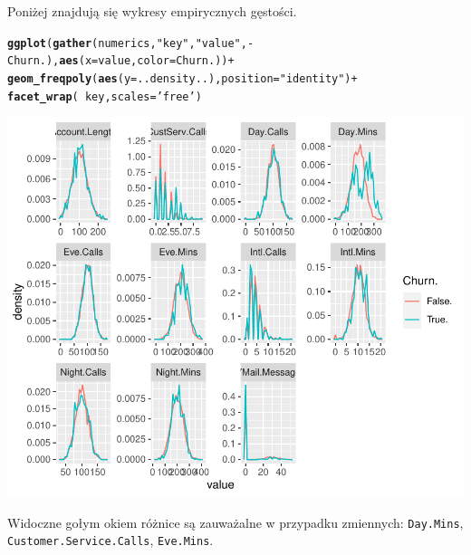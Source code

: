 \documentclass{article}\usepackage[]{graphicx}\usepackage[]{color}
\makeatletter
\def\maxwidth{ %
  \ifdim\Gin@nat@width>\linewidth
    \linewidth
  \else
    \Gin@nat@width
  \fi
}
\newcommand{\hlstr}[1]{\textcolor[rgb]{0.192,0.494,0.8}{#1}}%
\newcommand{\hlopt}[1]{\textcolor[rgb]{0,0,0}{#1}}%
\newcommand{\hlstd}[1]{\textcolor[rgb]{0.345,0.345,0.345}{#1}}%
\newcommand{\hlkwc}[1]{\textcolor[rgb]{0.333,0.667,0.333}{#1}}%
\newcommand{\hlkwd}[1]{\textcolor[rgb]{0.737,0.353,0.396}{\textbf{#1}}}%
\newenvironment{kframe}{%
 \def\at@end@of@kframe{}%
 \ifinner\ifhmode%
  \def\at@end@of@kframe{\end{minipage}}%
  \begin{minipage}{\columnwidth}%
 \fi\fi%
 \def\FrameCommand##1{\hskip\@totalleftmargin \hskip-\fboxsep
 \colorbox{shadecolor}{##1}\hskip-\fboxsep
     \hskip-\linewidth \hskip-\@totalleftmargin \hskip\columnwidth}%
 \MakeFramed {\advance\hsize-\width
   \@totalleftmargin\z@ \linewidth\hsize
   \@setminipage}}%
 {\par\unskip\endMakeFramed%
 \at@end@of@kframe}
\newenvironment{knitrout}{}{} %
\makeatother
\begin{document}
Poniżej znajdują się wykresy empirycznych gęstości.
\begin{knitrout}
\color{fgcolor}\begin{kframe}
\begin{alltt}
\hlkwd{ggplot}\hlstd{(}\hlkwd{gather}\hlstd{(numerics,} \hlstr{"key"}\hlstd{,} \hlstr{"value"}\hlstd{,} \hlopt{-}\hlstd{Churn.),} \hlkwd{aes}\hlstd{(}\hlkwc{x}\hlstd{=value,} \hlkwc{color}\hlstd{=Churn.))} \hlopt{+}
  \hlkwd{geom_freqpoly}\hlstd{(}\hlkwd{aes}\hlstd{(}\hlkwc{y}\hlstd{=..density..),} \hlkwc{position}\hlstd{=}\hlstr{"identity"}\hlstd{)} \hlopt{+}
  \hlkwd{facet_wrap}\hlstd{(}\hlopt{~}\hlstd{key,} \hlkwc{scales}\hlstd{=}\hlstr{'free'}\hlstd{)}
\end{alltt}
\end{kframe}

{\centering \includegraphics[width=\maxwidth]{figure/Wykresy_gestosci-1} 

}



\end{knitrout}
Widoczne gołym okiem różnice są zauważalne w przypadku zmiennych: \verb|Day.Mins|, \verb|Customer.Service.Calls|, \verb|Eve.Mins|.
\end{document}
